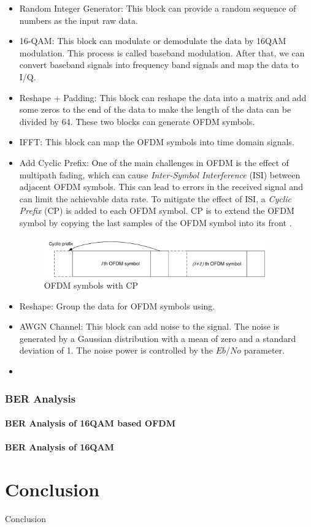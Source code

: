 \documentclass{article}
\numberwithin{figure}{section}
\numberwithin{equation}{section}
\begin{document}
\begin{itemize}
    \item Random Integer Generator: This block can provide a random sequence of numbers as the input raw data.
    \item 16-QAM: This block can modulate or demodulate the data by 16QAM modulation. This process is called baseband modulation. After that, we can convert baseband signals into frequency band signals and map the data to I/Q.
    \item Reshape + Padding: This block can reshape the data into a matrix and add some zeros to the end of the data to make the length of the data can be divided by 64. These two blocks can generate OFDM symbols.
    \item IFFT: This block can map the OFDM symbols into time domain signals. 
    \item Add Cyclic Prefix: One of the main challenges in OFDM is the effect of multipath fading, which can cause \textit{Inter-Symbol Interference} (ISI) between adjacent OFDM symbols. This can lead to errors in the received signal and can limit the achievable data rate. To mitigate the effect of ISI, a \textit{Cyclic Prefix} (CP) is added to each OFDM symbol. CP is to extend the OFDM symbol by copying the last samples of the OFDM symbol into its front \cite{RN146}.
    \begin{figure}[!ht]
        \centering
        \includegraphics[width=0.9\textwidth]{images/Cyclic prefix.pdf}
        \caption{OFDM symbols with CP}
        \label{fig:CP}
    \end{figure}
    \item Reshape: Group the data for OFDM symbols using.
    \item AWGN Channel: This block can add noise to the signal. The noise is generated by a Gaussian distribution with a mean of zero and a standard deviation of 1. The noise power is controlled by the $Eb/No$ parameter.
    \item 
\end{itemize}

\section{BER Analysis}

\subsection{BER Analysis of 16QAM based OFDM}

\subsection{BER Analysis of 16QAM}

\part{Conclusion}
Conclusion




\end{document}
